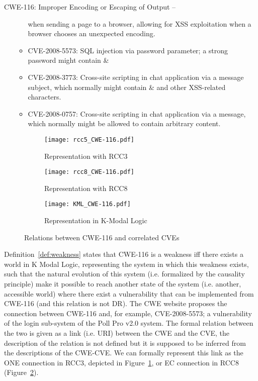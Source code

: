 \begin{example}{CWE-116: Improper Encoding or Escaping of Output\autocite{CWE-116} --}
\begin{itemize}
\begin{itemize}
				when sending a page to a browser, allowing for
				XSS exploitation when a browser chooses
				an unexpected encoding.
			\item CVE-2008-5573\autocite{CVE-2008-5573}: SQL injection via password
				parameter; a strong password might contain \&
			\item CVE-2008-3773\autocite{CVE-2008-3773}: Cross-site scripting in chat
				application via a message subject, which
				normally might contain \& and other
				XSS-related characters.
			\item CVE-2008-0757\autocite{CVE-2008-0757}: Cross-site scripting in chat
				application via a message, which normally might
				be allowed to contain arbitrary
				content.
			\end{itemize}
\end{itemize}

\begin{figure}[t]
	\centering
	\begin{subfigure}[b]{.5\textwidth}
		\centering
		\texttt{[image: rcc5\_CWE-116.pdf]}
		\caption{Representation with RCC3}
		\label{fig:rcc5_CWE-116}
	\end{subfigure}\begin{subfigure}[b]{.5\textwidth}
		\centering
		\texttt{[image: rcc8\_CWE-116.pdf]}
		\caption{Representation with RCC8}
		\label{fig:rcc8_CWE-116}
	\end{subfigure}
	\begin{subfigure}[b]{\textwidth}
		\centering
		\texttt{[image: KML\_CWE-116.pdf]}
		\caption{Representation in K-Modal Logic}
		\label{fig:KML_CWE-116}
	\end{subfigure}
	\caption{Relations between CWE-116 and correlated CVEs}
\end{figure}
Definition~\ref{def:weakness} states that CWE-116 is a weakness iff there exists a world in
K Modal Logic, representing the system in which this weakness exists, 
such that the natural evolution of this system (i.e. formalized by the causality principle) 
make it possible to reach another state of the system (i.e. another, accessible world)
where there exist a vulnerability that can be implemented from CWE-116 (and this relation 
is not DR). The CWE website proposes the connection between CWE-116 and, for example, 
CVE-2008-5573; a vulnerability of the login sub-system 
of the Poll Pro v2.0\autocite{pollpro} system.
The formal relation between the two is given as a link (i.e. URI) between the CWE and
the CVE, the description of the relation is not defined but it is supposed to be
inferred from the descriptions of the CWE-CVE. 
We can formally represent this link as the ONE connection in RCC3, depicted in 
Figure~\ref{fig:rcc5_CWE-116}, or EC connection in RCC8 (Figure~\ref{fig:rcc8_CWE-116}).

\end{example}

